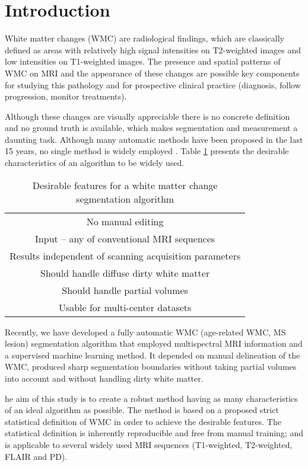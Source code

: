 \section{Introduction} \label{intro}


White matter changes (WMC) are radiological findings, which are classically defined as areas with relatively high signal intensities on T2-weighted images and low intensities on T1-weighted images. The presence and spatial patterns of WMC on MRI and the appearance of these changes are possible key components for studying this pathology and for prospective clinical practice (diagnosis, follow progression, monitor treatments).

Although these changes are visually appreciable there is no concrete definition and no ground truth is available, which makes segmentation and measurement a daunting task. Although many automatic methods have been proposed in the last 15 years, no single method is widely employed \cite{GarciaReview}. Table \ref{Table:Requirements} presents the desirable characteristics of an algorithm to be widely used.

\begin{table} 
    \begin{tabular}{ c }
        No manual editing \\ 
        Input – any of conventional MRI sequences \\ 
        Results independent of scanning acquisition parameters \\ 
        Should handle diffuse dirty white matter \\ 
        Should handle partial volumes \\ 
        Usable for multi-center datasets \\ 
    \end{tabular} 
    \caption{Desirable features for a white matter change segmentation algorithm } 
    \label{Table:Requirements}
\end{table}
    
Recently, we have developed a fully automatic WMC (age-related WMC, MS lesion) segmentation algorithm \cite{CascadeOrig} that employed multispectral MRI information and a supervised machine learning method. It depended on manual delineation of the WMC, produced sharp segmentation boundaries without taking partial volumes into account and without handling dirty white matter.
    
he aim of this study is to create a robust method having as many characteristics of an ideal algorithm as possible. The method is based on a proposed strict statistical definition of WMC in order to achieve the desirable features. The statistical definition is inherently reproducible and free from manual training; and is applicable to several widely used MRI sequences (T1-weighted, T2-weighted, FLAIR and PD).

